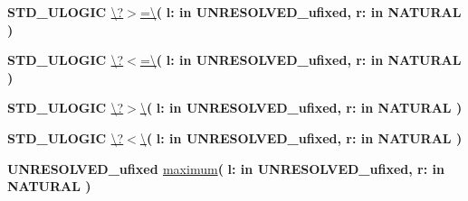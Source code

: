 \begin{DoxyCompactItemize}
\item 
{\bfseries {\bfseries \textcolor{comment}{S\+T\+D\+\_\+\+U\+L\+O\+G\+I\+C}\textcolor{vhdlchar}{ }}} \hyperlink{class__fixed__pkg_a3adee8c12e5c0bb76fc3e1a493284a27}{\textbackslash{}?$>$=\textbackslash{}}{\bfseries  ( }{\bfseries \textcolor{vhdlchar}{l\+: }\textcolor{stringliteral}{in }\textcolor{vhdlchar}{U\+N\+R\+E\+S\+O\+L\+V\+E\+D\+\_\+ufixed}}{\bfseries  , \textcolor{vhdlchar}{r\+: }\textcolor{stringliteral}{in }{\bfseries \textcolor{comment}{N\+A\+T\+U\+R\+A\+L}\textcolor{vhdlchar}{ }}}{\bfseries  )} 
\item 
{\bfseries {\bfseries \textcolor{comment}{S\+T\+D\+\_\+\+U\+L\+O\+G\+I\+C}\textcolor{vhdlchar}{ }}} \hyperlink{class__fixed__pkg_a271da29f659a2bc9480dbd29d7727913}{\textbackslash{}?$<$=\textbackslash{}}{\bfseries  ( }{\bfseries \textcolor{vhdlchar}{l\+: }\textcolor{stringliteral}{in }\textcolor{vhdlchar}{U\+N\+R\+E\+S\+O\+L\+V\+E\+D\+\_\+ufixed}}{\bfseries  , \textcolor{vhdlchar}{r\+: }\textcolor{stringliteral}{in }{\bfseries \textcolor{comment}{N\+A\+T\+U\+R\+A\+L}\textcolor{vhdlchar}{ }}}{\bfseries  )} 
\item 
{\bfseries {\bfseries \textcolor{comment}{S\+T\+D\+\_\+\+U\+L\+O\+G\+I\+C}\textcolor{vhdlchar}{ }}} \hyperlink{class__fixed__pkg_a9e6b6b8c2c14da978e6f70cb6e85e6dc}{\textbackslash{}?$>$\textbackslash{}}{\bfseries  ( }{\bfseries \textcolor{vhdlchar}{l\+: }\textcolor{stringliteral}{in }\textcolor{vhdlchar}{U\+N\+R\+E\+S\+O\+L\+V\+E\+D\+\_\+ufixed}}{\bfseries  , \textcolor{vhdlchar}{r\+: }\textcolor{stringliteral}{in }{\bfseries \textcolor{comment}{N\+A\+T\+U\+R\+A\+L}\textcolor{vhdlchar}{ }}}{\bfseries  )} 
\item 
{\bfseries {\bfseries \textcolor{comment}{S\+T\+D\+\_\+\+U\+L\+O\+G\+I\+C}\textcolor{vhdlchar}{ }}} \hyperlink{class__fixed__pkg_a7e98e66a4a282c529968f69f70dd16ad}{\textbackslash{}?$<$\textbackslash{}}{\bfseries  ( }{\bfseries \textcolor{vhdlchar}{l\+: }\textcolor{stringliteral}{in }\textcolor{vhdlchar}{U\+N\+R\+E\+S\+O\+L\+V\+E\+D\+\_\+ufixed}}{\bfseries  , \textcolor{vhdlchar}{r\+: }\textcolor{stringliteral}{in }{\bfseries \textcolor{comment}{N\+A\+T\+U\+R\+A\+L}\textcolor{vhdlchar}{ }}}{\bfseries  )} 
\item 
{\bfseries {\bfseries \textcolor{vhdlchar}{U\+N\+R\+E\+S\+O\+L\+V\+E\+D\+\_\+ufixed}\textcolor{vhdlchar}{ }}} \hyperlink{class__fixed__pkg_a8e1abbe4534fa7d5dea9fee275da3723}{maximum}{\bfseries  ( }{\bfseries \textcolor{vhdlchar}{l\+: }\textcolor{stringliteral}{in }\textcolor{vhdlchar}{U\+N\+R\+E\+S\+O\+L\+V\+E\+D\+\_\+ufixed}}{\bfseries  , \textcolor{vhdlchar}{r\+: }\textcolor{stringliteral}{in }{\bfseries \textcolor{comment}{N\+A\+T\+U\+R\+A\+L}\textcolor{vhdlchar}{ }}}{\bfseries  )} 

\end{DoxyCompactItemize}
